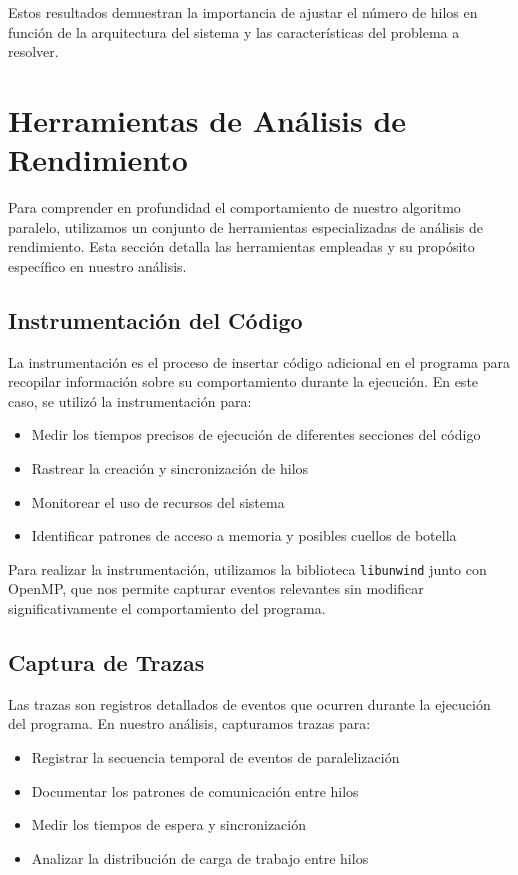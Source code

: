\documentclass[a4paper, 10pt, onecolumn]{IEEEtran}
\begin{document}
Estos resultados demuestran la importancia de ajustar el número de hilos en función de la arquitectura del sistema y las características del problema a resolver.

\section{Herramientas de Análisis de Rendimiento}
Para comprender en profundidad el comportamiento de nuestro algoritmo paralelo, utilizamos un conjunto de herramientas especializadas de análisis de rendimiento. Esta sección detalla las herramientas empleadas y su propósito específico en nuestro análisis.

\subsection{Instrumentación del Código}
La instrumentación es el proceso de insertar código adicional en el programa para recopilar información sobre su comportamiento durante la ejecución. En este caso, se utilizó la instrumentación para:

\begin{itemize}
  \item Medir los tiempos precisos de ejecución de diferentes secciones del código
  \item Rastrear la creación y sincronización de hilos
  \item Monitorear el uso de recursos del sistema
  \item Identificar patrones de acceso a memoria y posibles cuellos de botella
\end{itemize}

Para realizar la instrumentación, utilizamos la biblioteca \texttt{libunwind} junto con OpenMP, que nos permite capturar eventos relevantes sin modificar significativamente el comportamiento del programa.

\subsection{Captura de Trazas}
Las trazas son registros detallados de eventos que ocurren durante la ejecución del programa. En nuestro análisis, capturamos trazas para:

\begin{itemize}
  \item Registrar la secuencia temporal de eventos de paralelización
  \item Documentar los patrones de comunicación entre hilos
  \item Medir los tiempos de espera y sincronización
  \item Analizar la distribución de carga de trabajo entre hilos
\end{itemize}
\end{document}
